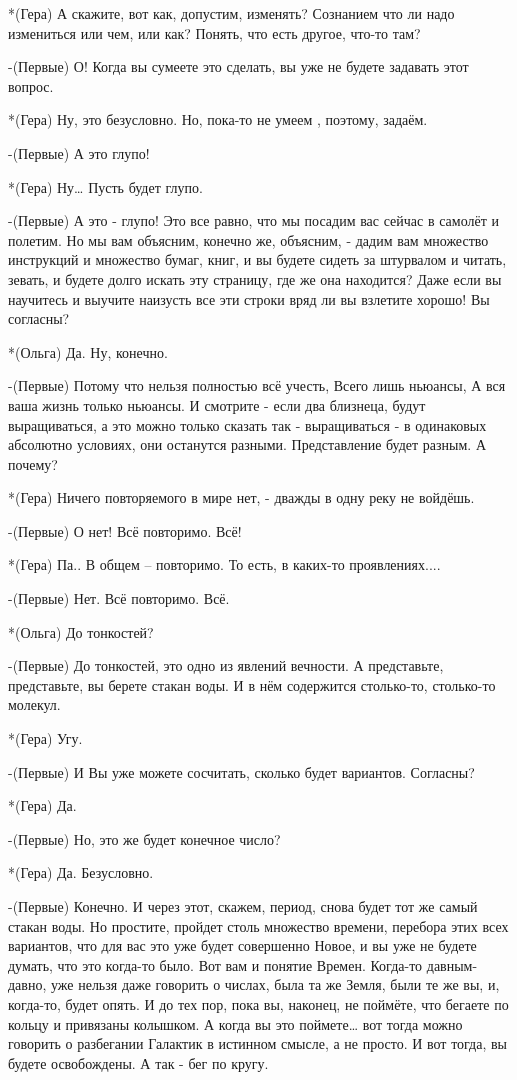 *(Гера) А скажите, вот как, допустим, изменять? Сознанием что ли надо измениться или чем, или как? Понять, что есть другое, что-то там?

-(Первые) О! Когда вы сумеете это сделать, вы уже не будете задавать этот вопрос.

*(Гера) Ну, это безусловно. Но, пока-то не умеем , поэтому, задаём.

-(Первые) А это глупо! 

*(Гера) Ну… Пусть будет глупо.

-(Первые) А это - глупо! Это все равно, что мы посадим вас сейчас в самолёт и полетим. Но мы вам объясним, конечно же, объясним, -  дадим вам множество инструкций и множество бумаг, книг, и вы будете сидеть за штурвалом и читать, зевать, и будете долго искать эту страницу, где же она находится? Даже если вы научитесь и выучите наизусть все эти строки вряд ли вы взлетите хорошо! Вы согласны?

*(Ольга) Да. Ну, конечно.

-(Первые) Потому что нельзя полностью всё учесть,  Всего лишь ньюансы, А вся ваша жизнь только ньюансы. И смотрите - если два близнеца, будут выращиваться, а это можно только сказать так - выращиваться - в одинаковых абсолютно условиях, они останутся разными. Представление будет разным. А почему?

*(Гера) Ничего повторяемого в мире нет, - дважды в одну реку не войдёшь.

-(Первые) О нет! Всё повторимо. Всё!

*(Гера) Па.. В общем – повторимо. То есть, в каких-то проявлениях....

-(Первые) Нет. Всё повторимо. Всё.

*(Ольга) До тонкостей?

-(Первые) До тонкостей, это одно из явлений вечности. А представьте, представьте, вы берете стакан воды. И в нём содержится столько-то, столько-то молекул.

*(Гера) Угу.

-(Первые) И Вы уже можете сосчитать, сколько будет вариантов. Согласны? 

*(Гера) Да.

-(Первые) Но, это же будет конечное число?

*(Гера) Да. Безусловно.

-(Первые) Конечно. И через этот, скажем, период, снова будет тот же самый стакан воды. Но простите, пройдет столь множество времени, перебора этих всех вариантов, что для вас это уже будет совершенно Новое, и вы уже не будете думать, что это когда-то было. Вот вам и понятие Времен. Когда-то давным-давно, уже нельзя даже говорить о числах, была та же Земля, были те же вы, и, когда-то, будет опять. И до тех пор, пока вы, наконец, не поймёте, что бегаете по кольцу и привязаны колышком. А когда вы это поймете… вот тогда можно говорить о разбегании Галактик в истинном смысле, а не просто. И вот тогда,  вы будете освобождены. А так - бег по кругу.

